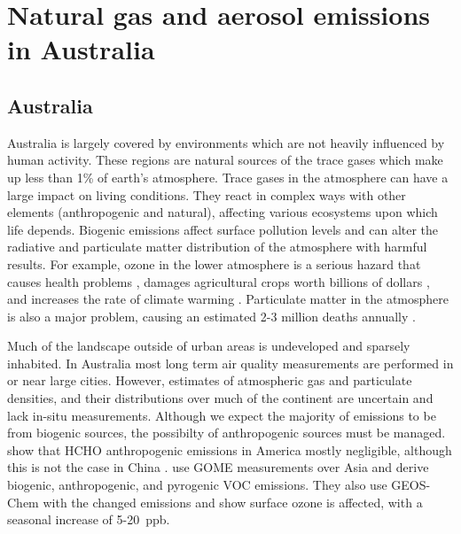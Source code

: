     
\section{Natural gas and aerosol emissions in Australia}
\label{ch_LitRev:sec:emissions}

  \subsection{Australia}

    Australia is largely covered by environments which are not heavily influenced by human activity.
    These regions are natural sources of the trace gases which make up less than 1\% of earth's atmosphere.
    Trace gases in the atmosphere can have a large impact on living conditions.
    They react in complex ways with other elements (anthropogenic and natural), affecting various ecosystems upon which life depends.
    Biogenic emissions affect surface pollution levels and can alter the radiative and particulate matter distribution of the atmosphere with harmful results.
    For example, ozone in the lower atmosphere is a serious hazard that causes health problems \citep{Hsieh2013}, damages agricultural crops worth billions of dollars \citep{Avnery2011}, and increases the rate of climate warming \citep{IPCC_2013_chap8}.
    Particulate matter in the atmosphere is also a major problem, causing an estimated 2-3 million deaths annually \citep{Hoek2013, Krewski2009, Silva2013, Lelieveld2015}. 

    Much of the landscape outside of urban areas is undeveloped and sparsely inhabited.
    In Australia most long term air quality measurements are performed in or near large cities.
    However, estimates of atmospheric gas and particulate densities, and their distributions over much of the continent are uncertain and lack in-situ measurements.
    Although we expect the majority of emissions to be from biogenic sources, the possibilty of anthropogenic sources must be managed.
    \cite{Millet2008} show that HCHO anthropogenic emissions in America mostly negligible, although this is not the case in China \citep{Fu2007}. 
    \cite{Fu2007} use GOME measurements over Asia and derive biogenic, anthropogenic, and pyrogenic VOC emissions.
    They also use GEOS-Chem with the changed emissions and show surface ozone is affected, with a seasonal increase of 5-20~ppb.
    
